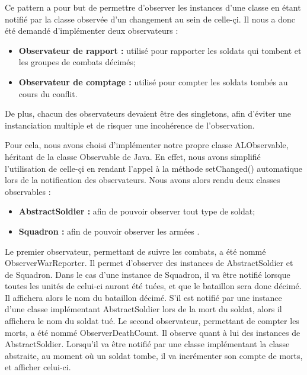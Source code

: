 \documentclass[12pt]{article}
\begin{document}
Ce pattern a pour but de permettre d'observer les instances d'une classe en étant notifié par la classe observée d'un changement au sein de celle-çi. Il nous a donc été demandé d'implémenter deux observateurs :
\begin{itemize}
\item \textbf{Observateur de rapport :} utilisé pour rapporter les soldats qui tombent et les groupes de combats décimés; 
\item \textbf{Observateur de comptage :} utilisé pour compter les soldats tombés au cours du conflit. 
\end{itemize}
De plus, chacun des observateurs devaient être des singletons, afin d'éviter une instanciation multiple et de risquer une incohérence de l'observation.

Pour cela, nous avons choisi d'implémenter notre propre classe ALObservable, héritant de la classe Observable de Java. En effet, nous avons simplifié l'utilisation de celle-çi en rendant l'appel à la méthode setChanged() automatique lors de la notification des observateurs.
Nous avons alors rendu deux classes observables :
\begin{itemize}
\item \textbf{AbstractSoldier :} afin de pouvoir observer tout type de soldat;
\item \textbf{Squadron :} afin de pouvoir observer les armées .
\end{itemize}

Le premier observateur, permettant de suivre les combats, a été nommé ObserverWarReporter. Il permet d'observer des instances de AbstractSoldier et de Squadron.
Dans le cas d'une instance de Squadron, il va être notifié lorsque toutes les unités de celui-ci auront été tuées, et que le bataillon sera donc décimé. Il affichera alors le nom du bataillon décimé. S'il est notifié par une instance d'une classe implémentant AbstractSoldier lors de la mort du soldat, alors il affichera le nom du soldat tué.
Le second observateur, permettant de compter les morts, a été nommé ObserverDeathCount. Il observe quant à lui des instances de AbstractSoldier. Lorsqu'il va être notifié par une classe implémentant la classe abstraite, au moment où un soldat tombe, il va incrémenter son compte de morts, et afficher celui-ci.
\end{document}

